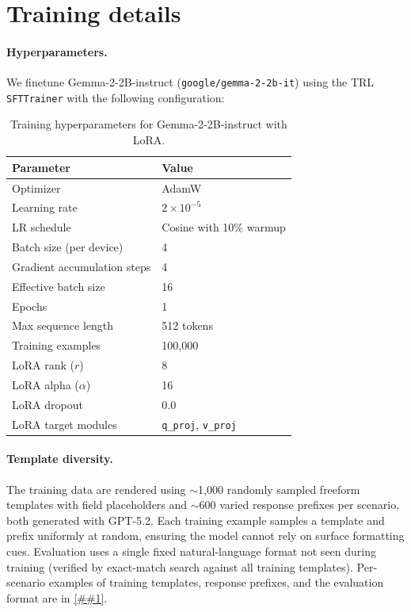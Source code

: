 \documentclass{article} %
\newcommand{\Cref}[1]{\ref{##1}}
\begin{document}
\section{Training details}
\label{app:training}

\paragraph{Hyperparameters.}
We finetune Gemma-2-2B-instruct (\texttt{google/gemma-2-2b-it}) using the TRL \texttt{SFTTrainer} with the following configuration:

\begin{table}[h]
\small\centering
\renewcommand{\arraystretch}{1.1}
\begin{tabular}{@{}ll@{}}
\toprule
\textbf{Parameter} & \textbf{Value} \\
\midrule
Optimizer & AdamW \\
Learning rate & $2 \times 10^{-5}$ \\
LR schedule & Cosine with 10\% warmup \\
Batch size (per device) & 4 \\
Gradient accumulation steps & 4 \\
Effective batch size & 16 \\
Epochs & 1 \\
Max sequence length & 512 tokens \\
Training examples & 100{,}000 \\[3pt]
LoRA rank ($r$) & 8 \\
LoRA alpha ($\alpha$) & 16 \\
LoRA dropout & 0.0 \\
LoRA target modules & \texttt{q\_proj}, \texttt{v\_proj} \\
\bottomrule
\end{tabular}
\renewcommand{\arraystretch}{1.0}
\caption{Training hyperparameters for Gemma-2-2B-instruct with LoRA.}
\label{tab:hyperparams}
\end{table}

\paragraph{Template diversity.}
The training data are rendered using ${\sim}$1{,}000 randomly sampled freeform templates with field placeholders and ${\sim}$600 varied response prefixes per scenario, both generated with GPT-5.2.
Each training example samples a template and prefix uniformly at random, ensuring the model cannot rely on surface formatting cues.
Evaluation uses a single fixed natural-language format not seen during training (verified by exact-match search against all training templates).
Per-scenario examples of training templates, response prefixes, and the evaluation format are in \Cref{app:scenarios}.
\end{document}
